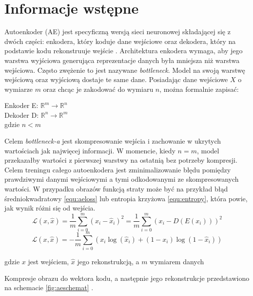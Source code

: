\documentclass[a4paper,12pt,oneside]{book} %
\begin{document}
\section{Informacje wstępne}
Autoenkoder (AE) jest specyficzną wersją sieci neuronowej składającej się z dwóch części: enkodera, który koduje dane wejściowe oraz dekodera, który na podstawie kodu rekonstruuje wejście \cite{bank2021autoencoders}. Architektura enkodera wymaga, aby jego warstwa wyjściowa generująca reprezentacje danych była mniejsza niż warstwa wejściowa. Często zwężenie to jest nazywane \textit{bottleneck}. Model na swoją warstwę wejściową oraz wyjściową dostaje te same dane. Posiadając dane wejściowe $X$ o wymiarze $m$ oraz chcąc je zakodować do wymiaru $n$, można formalnie zapisać:

\begin{center}
	Enkoder E: $\mathbb{R}^m \rightarrow \mathbb{R}^n$\\
	Dekoder D: $\mathbb{R}^n \rightarrow \mathbb{R}^m$\\
	gdzie $n < m$\\
\end{center}
Celem \textit{bottleneck-a} jest skompresowanie wejścia i zachowanie w ukrytych wartościach jak najwięcej informacji. W momencie, kiedy $n = m$, model przekazałby wartości z pierwszej warstwy na ostatnią bez potrzeby kompresji. Celem treningu całego autoenkodera jest zminimalizowanie błędu pomiędzy prawdziwymi danymi wejściowymi a tymi odkodowanymi ze skompresowanych wartości. W przypadku obrazów funkcją straty może być na przykład błąd średniokwadratowy \ref{equ:aeloss} lub entropia krzyżowa \ref{equ:entropy}, która powie, jak wynik różni się od wejścia. 
 \begin{equation}
 		 \mathcal{L}(x, \hat{x}) = \dfrac{1}{m}\displaystyle\sum_{i=0}^{m}(x_i-\hat{x}_i)^2 =\dfrac{1}{m}\displaystyle\sum_{i=0}^{m}(x_i-D(E(x_i)))^2
 		 \label{equ:aeloss}
 \end{equation}
 \begin{equation}
	\mathcal{L}(x, \hat{x}) = -\dfrac{1}{m}\displaystyle\sum_{i=0}^{m}(x_i\log(\hat{x}_i) + (1 -x_i)\log(1-\hat{x}_i))
	\label{equ:entropy}
\end{equation}
\begin{center}
	gdzie $x$ jest wejściem, $\hat{x}$ jego rekonstrukcją, a $m$ wymiarem danych
\end{center}
Kompresje obrazu do wektora kodu, a następnie jego rekonstrukcje przedstawiono na schemacie \ref{fig:aeschemat} \cite{bank2021autoencoders}.
\end{document}

